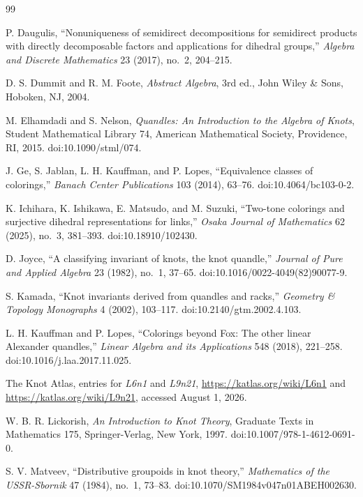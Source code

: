 \documentclass[11pt]{article}
\theoremstyle{definition}
\begin{document}
\begin{thebibliography}{99}

P. Daugulis, ``Nonuniqueness of semidirect decompositions for semidirect products with directly decomposable factors and applications for dihedral groups,'' \emph{Algebra and Discrete Mathematics} 23 (2017), no.~2, 204--215.

D. S. Dummit and R. M. Foote, \emph{Abstract Algebra}, 3rd ed., John Wiley \& Sons, Hoboken, NJ, 2004.

M. Elhamdadi and S. Nelson, \emph{Quandles: An Introduction to the Algebra of Knots}, Student Mathematical Library 74, American Mathematical Society, Providence, RI, 2015. doi:10.1090/stml/074.

J. Ge, S. Jablan, L. H. Kauffman, and P. Lopes, ``Equivalence classes of colorings,'' \emph{Banach Center Publications} 103 (2014), 63--76. doi:10.4064/bc103-0-2.

K. Ichihara, K. Ishikawa, E. Matsudo, and M. Suzuki, ``Two-tone colorings and surjective dihedral representations for links,'' \emph{Osaka Journal of Mathematics} 62 (2025), no.~3, 381--393. doi:10.18910/102430.

D. Joyce, ``A classifying invariant of knots, the knot quandle,'' \emph{Journal of Pure and Applied Algebra} 23 (1982), no.~1, 37--65. doi:10.1016/0022-4049(82)90077-9.

S. Kamada, ``Knot invariants derived from quandles and racks,'' \emph{Geometry \& Topology Monographs} 4 (2002), 103--117. doi:10.2140/gtm.2002.4.103.

L. H. Kauffman and P. Lopes, ``Colorings beyond Fox: The other linear Alexander quandles,'' \emph{Linear Algebra and its Applications} 548 (2018), 221--258. doi:10.1016/j.laa.2017.11.025.

The Knot Atlas, entries for \emph{L6n1} and \emph{L9n21}, \url{https://katlas.org/wiki/L6n1} and \url{https://katlas.org/wiki/L9n21}, accessed August 1, 2026.

W. B. R. Lickorish, \emph{An Introduction to Knot Theory}, Graduate Texts in Mathematics 175, Springer-Verlag, New York, 1997. doi:10.1007/978-1-4612-0691-0.

S. V. Matveev, ``Distributive groupoids in knot theory,'' \emph{Mathematics of the USSR-Sbornik} 47 (1984), no.~1, 73--83. doi:10.1070/SM1984v047n01ABEH002630.


\end{thebibliography}
\end{document}
